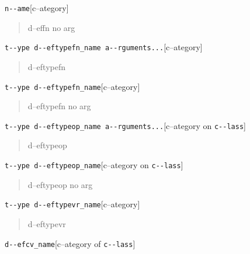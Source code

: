 \documentclass{book}
\begin{document}
\noindent\texttt{n{-}{-}ame}\hfill[c--ategory]



%
\begin{quote}
\unskip{\parskip=0pt\noindent}%
d--effn no arg
\end{quote}

\noindent\texttt{t{-}{-}ype d{-}{-}eftypefn\_name a{-}{-}rguments...}\hfill[c--ategory]



%
\begin{quote}
\unskip{\parskip=0pt\noindent}%
d--eftypefn
\end{quote}

\noindent\texttt{t{-}{-}ype d{-}{-}eftypefn\_name}\hfill[c--ategory]



%
\begin{quote}
\unskip{\parskip=0pt\noindent}%
d--eftypefn no arg
\end{quote}

\noindent\texttt{t{-}{-}ype d{-}{-}eftypeop\_name a{-}{-}rguments...}\hfill[c--ategory on \texttt{c{-}{-}lass}]



%
\begin{quote}
\unskip{\parskip=0pt\noindent}%
d--eftypeop
\end{quote}

\noindent\texttt{t{-}{-}ype d{-}{-}eftypeop\_name}\hfill[c--ategory on \texttt{c{-}{-}lass}]



%
\begin{quote}
\unskip{\parskip=0pt\noindent}%
d--eftypeop no arg
\end{quote}

\noindent\texttt{t{-}{-}ype d{-}{-}eftypevr\_name}\hfill[c--ategory]



%
\begin{quote}
\unskip{\parskip=0pt\noindent}%
d--eftypevr
\end{quote}

\noindent\texttt{d{-}{-}efcv\_name}\hfill[c--ategory of \texttt{c{-}{-}lass}]
\end{document}
